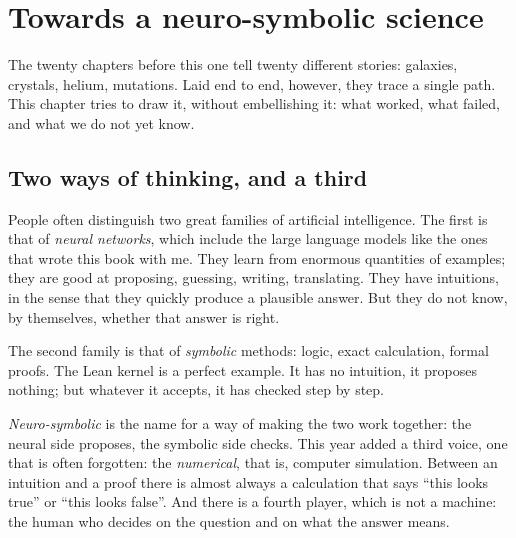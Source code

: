 \xdef\labelcourant{ch:neurosymbolique}
\chapter{Towards a neuro-symbolic science}

The twenty chapters before this one tell twenty different stories: galaxies, crystals, helium, mutations. Laid end to
end, however, they trace a single path. This chapter tries to draw it, without embellishing it: what worked, what
failed, and what we do not yet know.

\section{Two ways of thinking, and a third}

People often distinguish two great families of artificial intelligence. The first is that of \emph{neural networks},
which include the large language models like the ones that wrote this book with me. They learn from enormous
quantities of examples; they are good at proposing, guessing, writing, translating. They have intuitions, in the
sense that they quickly produce a plausible answer. But they do not know, by themselves, whether that answer is right.

The second family is that of \emph{symbolic} methods: logic, exact calculation, formal proofs. The Lean kernel is a
perfect example. It has no intuition, it proposes nothing; but whatever it accepts, it has checked step by step.

\emph{Neuro-symbolic} is the name for a way of making the two work together: the neural side proposes, the symbolic
side checks. This year added a third voice, one that is often forgotten: the \emph{numerical}, that is, computer
simulation. Between an intuition and a proof there is almost always a calculation that says ``this looks true'' or
``this looks false''. And there is a fourth player, which is not a machine: the human who decides on the question and
on what the answer means.

